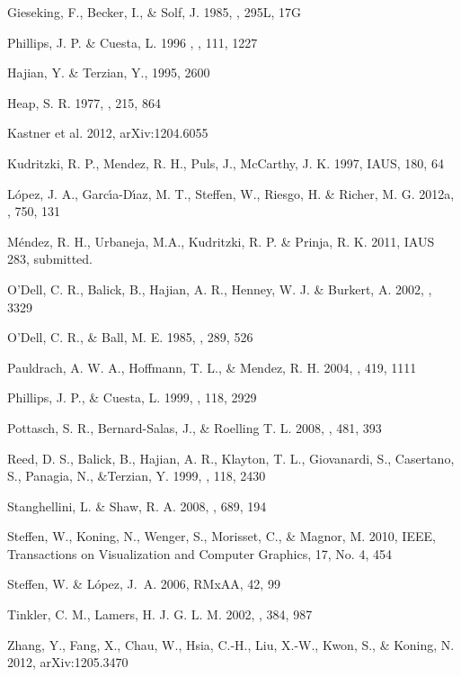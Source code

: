 \documentclass[useAMS, usenatbib]{mnras}
\begin{document}
\begin{thebibliography}{}
 Gieseking, F., Becker,
  I., \& Solf, J. 1985, \apj, 295L, 17G
  
 Phillips, J. P. \& Cuesta, L. 1996
, \aj, 111, 1227

 Hajian, Y. \&  Terzian, Y., 1995,  2600





 Heap, S. R. 1977, \apj, 215, 864

 Kastner et al. 2012, arXiv:1204.6055

 Kudritzki, R. P., Mendez,
  R. H., Puls, J., McCarthy, J. K. 1997, IAUS, 180, 64

  
 L\'opez, J. A., Garc\'{\i}a-D\'{\i}az, M. T., Steffen, W., Riesgo, H. \& Richer, M. G. 2012a, \apj, 750, 131


 M\'endez, R. H., Urbaneja,
  M.A., Kudritzki, R. P. \& Prinja, R. K. 2011, IAUS 283, submitted.


  
 O'Dell, C. R., Balick, B., Hajian, A. R., Henney, W. J.
  \& Burkert, A. 2002, , 3329


 O'Dell, C. R., \& Ball,
  M. E. 1985, \apj, 289, 526

 Pauldrach, A. W. A.,
  Hoffmann, T. L., \& Mendez, R. H. 2004, \aap, 419, 1111

 Phillips, J. P., \&
  Cuesta, L. 1999, \aj, 118, 2929

 Pottasch, S. R., Bernard-Salas, J.,
  \& Roelling T. L.  2008, \aap, 481, 393

 Reed, D. S., Balick, B., Hajian, A. R.,
  Klayton, T. L., Giovanardi, S., Casertano, S., Panagia, N., \&Terzian, Y.
  1999, \aj, 118, 2430
  
  Stanghellini, L. \& Shaw, R. A. 2008, \apj, 689, 194
  
  Steffen, W., Koning, N., Wenger, S., Morisset, C., \& Magnor, M.
 2010, IEEE, Transactions on Visualization and Computer Graphics, 17, No. 4, 454 


 
  
 Steffen, W. \& L{\'o}pez, J.~A.
  2006, RMxAA, 42, 99 

 Tinkler, C. M., Lamers,
  H. J. G. L. M. 2002, \aap, 384, 987



 Zhang, Y., Fang, X., Chau, W., Hsia, C.-H., Liu, X.-W., Kwon, S., \& Koning, N. 2012, arXiv:1205.3470

\end{thebibliography}
\end{document}
